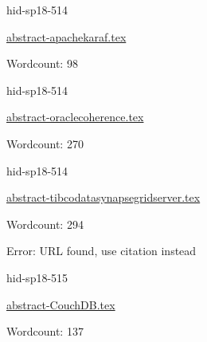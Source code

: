 

\begin{IU}

hid-sp18-514

\href{https://github.com/cloudmesh-community/hid-sp18-514/blob/master//technology/abstract-apachekaraf.tex}{abstract-apachekaraf.tex}

 

Wordcount: 98

\end{IU}



\begin{IU}

hid-sp18-514

\href{https://github.com/cloudmesh-community/hid-sp18-514/blob/master//technology/abstract-oraclecoherence.tex}{abstract-oraclecoherence.tex}

 

Wordcount: 270

\end{IU}



\begin{IU}

hid-sp18-514

\href{https://github.com/cloudmesh-community/hid-sp18-514/blob/master//technology/abstract-tibcodatasynapsegridserver.tex}{abstract-tibcodatasynapsegridserver.tex}

 

Wordcount: 294

Error: URL found, use citation instead
\end{IU}



\begin{IU}

hid-sp18-515

\href{https://github.com/cloudmesh-community/hid-sp18-515/blob/master//technology/abstract-CouchDB.tex}{abstract-CouchDB.tex}

 

Wordcount: 137

\end{IU}



